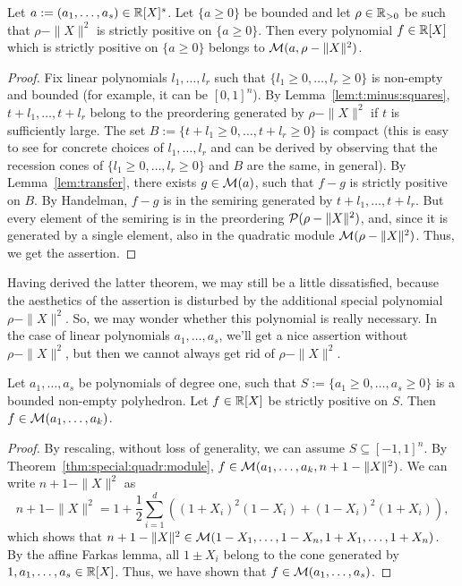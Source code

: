 \begin{theorem}
	\label{thm:special:quadr:module}
	Let $a:=(a_1,\ldots,a_s) \in \mathbb{R}[X]^s$. Let $\{ a \ge 0\}$ be bounded and let $\rho \in \mathbb{R}_{>0}$ be such that $\rho - \|X\|^2$ is strictly positive on $\{a \ge 0\}$. Then every polynomial $f \in \mathbb{R}[X]$ which is strictly positive on $\{a \ge 0\}$ belongs to $\mathcal{M}(a,\rho-\|X\|^2)$. 
\end{theorem}
\begin{proof}
		Fix linear polynomials $l_1,\ldots,l_r$ such that $\{l_1 \ge 0,\ldots,l_r \ge 0\}$ is non-empty and bounded (for example, it can be $[0,1]^n$). By Lemma~\ref{lem:t:minus:squares}, $t+l_1,\ldots, t+ l_r$ belong to the preordering generated by $\rho - \|X\|^2$ if $t$ is sufficiently large. The set $B:= \{t + l_1 \ge 0,\ldots, t+ l_r \ge 0\}$ is compact (this is easy to see for concrete choices of $l_1,\ldots,l_r$ and can be derived by observing that the recession cones of $\{l_1 \ge 0,\ldots, l_r \ge 0\}$ and $B$ are the same, in general). By Lemma~\ref{lem:transfer}, there exists $g \in \mathcal{M}(a)$, such that $f - g$ is strictly positive on $B$. By Handelman, $f - g$ is in the semiring generated by $t+l_1,\ldots,t+l_r$. But every element of the semiring is in the preordering $\mathcal{P}(\rho-\|X\|^2)$, and, since it is generated by a single element, also in the quadratic module $\mathcal{M}(\rho-\|X\|^2)$. Thus, we get the assertion. 
\end{proof}

Having derived the latter theorem, we may still be a little dissatisfied, because the aesthetics of the assertion is disturbed by the additional special polynomial $\rho - \|X\|^2$. So, we may wonder whether this polynomial is really necessary. In the case of linear polynomials $a_1,\ldots,a_s$, we'll get a nice assertion without $\rho - \|X\|^2$, but then we cannot always get rid of $\rho - \|X\|^2$.

\begin{theorem}
	Let $a_1,\ldots,a_s$ be polynomials of degree one, such that $S:=\{a_1 \ge 0,\ldots,a_s \ge 0\}$ is a bounded non-empty polyhedron. Let $f \in \mathbb{R}[X]$ be strictly positive on $S$. Then $f \in \mathcal{M}(a_1,\ldots,a_k)$. 
\end{theorem}
\begin{proof}
	By rescaling, without loss of generality, we can assume $S \subseteq [-1,1]^n$. By Theorem~\ref{thm:special:quadr:module}, $f  \in \mathcal{M}(a_1,\ldots,a_k,n+1 - \|X\|^2)$. We can write $n+1-\|X\|^2$ as 
	\[
		n+1-\|X\|^2 = 1 + \frac{1}{2} \sum_{i=1}^d ( (1+X_i)^2 (1-X_i) + (1-X_i)^2 (1+X_i)),
	\]
	which shows that $n+1-\|X\|^2 \in \mathcal{M}(1-X_1,\ldots,1-X_n,1+X_1,\ldots,1+X_n)$. By the affine Farkas lemma, all $1 \pm X_i$ belong to the cone generated by $1, a_1,\ldots,a_s \in \mathbb{R}[X]$. Thus, we have shown that $f \in \mathcal{M}(a_1,\ldots,a_s)$. 
\end{proof}

